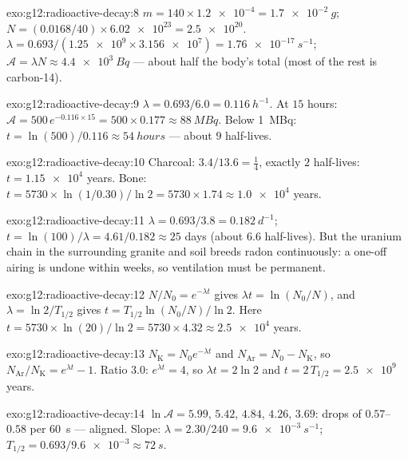 \begin{solution}{exo:g12:radioactive-decay:8}
$m = 140 \times \num{1.2e-4} = \qty{1.7e-2}{g}$;
$N = (0.0168/40) \times \num{6.02e23} = \num{2.5e20}$.
$\lambda = 0.693/(\num{1.25e9} \times \num{3.156e7}) =
\qty{1.76e-17}{s^{-1}}$; $\mathcal A = \lambda N \approx
\qty{4.4e3}{Bq}$ --- about half the body's total (most of the rest is
carbon-14).
\end{solution}

\begin{solution}{exo:g12:radioactive-decay:9}
$\lambda = 0.693/6.0 = \qty{0.116}{h^{-1}}$. At $15$ hours:
$\mathcal A = 500\,e^{-0.116 \times 15} = 500 \times 0.177 \approx
\qty{88}{MBq}$. Below \qty{1}{MBq}:
$t = \ln(500)/0.116 \approx \qty{54}{hours}$ --- about $9$
half-lives.
\end{solution}

\begin{solution}{exo:g12:radioactive-decay:10}
Charcoal: $3.4/13.6 = \tfrac14$, exactly $2$ half-lives:
$t = \num{1.15e4}$ years. Bone:
$t = \num{5730} \times \ln(1/0.30)/\ln 2 = \num{5730} \times 1.74
\approx \num{1.0e4}$ years.
\end{solution}

\begin{solution}{exo:g12:radioactive-decay:11}
$\lambda = 0.693/3.8 = \qty{0.182}{d^{-1}}$;
$t = \ln(100)/\lambda = 4.61/0.182 \approx 25$ days (about $6.6$
half-lives). But the uranium chain in the surrounding granite and
soil breeds radon continuously: a one-off airing is undone within
weeks, so ventilation must be permanent.
\end{solution}

\begin{solution}{exo:g12:radioactive-decay:12}
$N/N_0 = e^{-\lambda t}$ gives $\lambda t = \ln(N_0/N)$, and
$\lambda = \ln 2/T_{1/2}$ gives $t = T_{1/2}\ln(N_0/N)/\ln 2$. Here
$t = \num{5730} \times \ln(20)/\ln 2 = \num{5730} \times 4.32
\approx \num{2.5e4}$ years.
\end{solution}

\begin{solution}{exo:g12:radioactive-decay:13}
$N_{\mathrm K} = N_0 e^{-\lambda t}$ and
$N_{\mathrm{Ar}} = N_0 - N_{\mathrm K}$, so
$N_{\mathrm{Ar}}/N_{\mathrm K} = e^{\lambda t} - 1$. Ratio $3.0$:
$e^{\lambda t} = 4$, so $\lambda t = 2\ln 2$ and
$t = 2\,T_{1/2} = \num{2.5e9}$ years.
\end{solution}

\begin{solution}{exo:g12:radioactive-decay:14}
$\ln \mathcal A = 5.99$, $5.42$, $4.84$, $4.26$, $3.69$: drops of
$0.57$--$0.58$ per \qty{60}{s} --- aligned. Slope:
$\lambda = 2.30/240 = \qty{9.6e-3}{s^{-1}}$;
$T_{1/2} = 0.693/\num{9.6e-3} \approx \qty{72}{s}$.
\end{solution}

